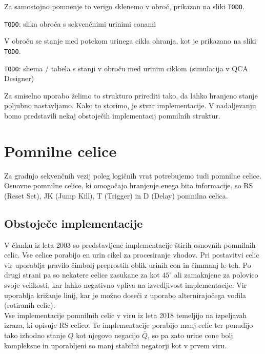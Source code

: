 \documentclass[a4paper, 11pt]{article}
\newcommand{\todo}{\textcolor{BrickRed}{\texttt{TODO}}} %
\begin{document}
Za samostojno pomnenje to verigo sklenemo v obroč, prikazan na sliki \todo.

\todo: slika obroča s sekvenčnimi urinimi conami

V obroču se stanje med potekom urinega cikla ohranja, kot je prikazano na sliki \todo.

\todo: shema / tabela s stanji v obroču med urinim ciklom (simulacija v QCA Designer)

Za smiselno uporabo želimo to strukturo prirediti tako, da lahko hranjeno stanje poljubno nastavljamo.
Kako to storimo, je stvar implementacije.
V nadaljevanju bomo predstavili nekaj obstoječih implementacij pomnilnih struktur.




\section{Pomnilne celice}
Za gradnjo sekvenčnih vezij poleg logičnih vrat potrebujemo tudi pomnilne celice. Osnovne pomnilne celice, ki omogočajo hranjenje enega bita informacije, so RS (Reset Set), JK (Jump Kill), T (Trigger) in D (Delay) pomnilna celica. 


\subsection{Obstoječe implementacije}
V članku \cite{quantum_dot} iz leta 2003 so predstavljene implementacije štirih osnovnih pomnilnih celic. Vse celice porabijo en urin cikel za procesiranje vhodov. Pri postavitvi celic vir uporablja pravilo čimbolj preprostih oblik urinih con in čimmanj le-teh. Po drugi strani pa so nekatere celice zasukane za kot $ 45^{\circ} $ ali zamaknjene za polovico svoje velikosti, kar lahko negativno vpliva na izvedljivost implementacije. Vir uporablja križanje linij, kar je možno doseči z uporabo alternirajočega vodila (rotiranih celic). \\
Vse implementacije pomnilnih celic v viru \cite{a_novel_approach} iz leta 2018 temeljijo na izpeljavah izraza, ki opisuje RS celico. Te implementacije porabijo manj celic ter ponudijo tako izhodno stanje $Q$ kot njegovo negacijo $\bar{Q}$, so pa zato urine cone bolj kompleksne in uporabljeni so manj stabilni negatorji kot v prvem viru.
\end{document}
